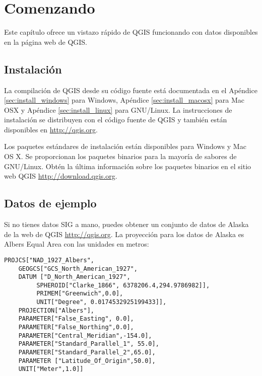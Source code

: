 \section{Comenzando}\label{label_getstarted}

Este capítulo ofrece un vistazo rápido de QGIS funcionando con datos disponibles 
en la página web de QGIS.

\subsection{Instalación}\label{label_installation}

La compilación de QGIS desde su código fuente está documentada en el Apéndice \ref{sec:install_windows} para Windows, Apéndice \ref{sec:install_macosx} para Mac OSX y Apéndice \ref{sec:install_linux} para GNU/Linux. 
La instrucciones de instalación se distribuyen con el código fuente de QGIS y
también están disponibles en \url{http://qgis.org}. 

Los paquetes estándares de instalación están disponibles para Windows y Mac OS X. 
Se proporcionan los paquetes binarios para la mayoría de sabores de GNU/Linux. 
Obtén la última información sobre los paquetes binarios en el sitio web QGIS
 \url{http://download.qgis.org}.

\subsection{Datos de ejemplo}\label{label_sampledata}

Si no tienes datos SIG a mano, puedes obtener un conjunto de datos de Alaska
de la web de QGIS \url{http://qgis.org}. La proyección para los datos de Alaska
es Albers Equal Area con las unidades en metros:

\begin{verbatim}
PROJCS["NAD_1927_Albers",
    GEOGCS["GCS_North_American_1927",
	DATUM ["D_North_American_1927",
	     SPHEROID["Clarke_1866", 6378206.4,294.9786982]],
	     PRIMEM["Greenwich",0.0],
	     UNIT["Degree", 0.0174532925199433]],
    PROJECTION["Albers"],
    PARAMETER["False_Easting", 0.0],
    PARAMETER["False_Northing",0.0],
    PARAMETER["Central_Meridian",-154.0],
    PARAMETER["Standard_Parallel_1", 55.0],
    PARAMETER["Standard_Parallel_2",65.0],
    PARAMETER ["Latitude_Of_Origin",50.0],
    UNIT["Meter",1.0]]
\end{verbatim}

